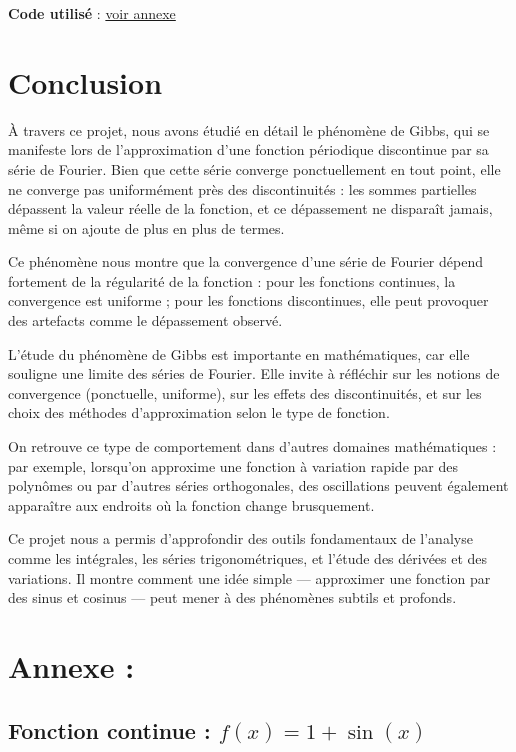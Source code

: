 \documentclass[11pt]{article} %
\begin{document}
\begin{large}
\vspace{0.5em}
\noindent\textbf{Code utilisé} : \hyperref[annexe_code_py]{voir annexe}



\section{Conclusion}

À travers ce projet, nous avons étudié en détail le phénomène de Gibbs, qui se manifeste lors de l’approximation d’une fonction périodique discontinue par sa série de Fourier. Bien que cette série converge ponctuellement en tout point, elle ne converge pas uniformément près des discontinuités : les sommes partielles dépassent la valeur réelle de la fonction, et ce dépassement ne disparaît jamais, même si on ajoute de plus en plus de termes.

Ce phénomène nous montre que la convergence d'une série de Fourier dépend fortement de la régularité de la fonction : pour les fonctions continues, la convergence est uniforme ; pour les fonctions discontinues, elle peut provoquer des artefacts comme le dépassement observé.

L’étude du phénomène de Gibbs est importante en mathématiques, car elle souligne une limite des séries de Fourier. Elle invite à réfléchir sur les notions de convergence (ponctuelle, uniforme), sur les effets des discontinuités, et sur les choix des méthodes d’approximation selon le type de fonction.

On retrouve ce type de comportement dans d'autres domaines mathématiques : par exemple, lorsqu’on approxime une fonction à variation rapide par des polynômes ou par d’autres séries orthogonales, des oscillations peuvent également apparaître aux endroits où la fonction change brusquement.

Ce projet nous a permis d’approfondir des outils fondamentaux de l’analyse comme les intégrales, les séries trigonométriques, et l’étude des dérivées et des variations. Il montre comment une idée simple — approximer une fonction par des sinus et cosinus — peut mener à des phénomènes subtils et profonds.



\appendix
\section{Annexe :}


\label{annexe_code_continue}


\subsection{Fonction continue : $f(x) = 1 + \sin(x)$}


\end{large}
\end{document}
